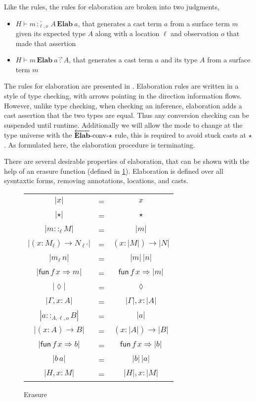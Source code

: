 Like the \bidir{} rules, the rules for elaboration are broken into two judgments,
\begin{itemize}
\item $H\vdash m\overleftarrow{\,:_{\ell,o}\,}A\,\textbf{Elab}\ a$, that generates a cast term $a$ from a surface term $m$ given its expected type $A$ along with a location $\ell$ and observation $o$ that made that assertion
\item $H\vdash m\,\textbf{Elab}\ a\overrightarrow{\,:\,}A$, that generates a cast term $a$ and its type $A$ from a surface term $m$
\end{itemize}
The rules for elaboration are presented in .
Elaboration rules are written in a style of \bidir{} type checking, with arrows pointing in the direction information flows.
However, unlike \bidir{} type checking, when checking an inference, elaboration adds a cast assertion that the two types are equal.
Thus any conversion checking can be suspended until runtime.
Additionally we will allow the mode to change at the type universe with the $\operatorname{\overleftarrow{\textbf{Elab}}-conv-\star}$ rule, this is required to avoid stuck casts at $\star$.
As formulated here, the elaboration procedure is terminating.
 
There are several desirable properties of elaboration, that can be shown with the help of an erasure function (defined in \ref{fig:erasure}).
Elaboration is defined over all sysntaxtic forms, removing annotations, locations, and casts.
 
\begin{figure}
\begin{tabular}{ccc}
$|x|$ & = & $x$\tabularnewline
$|\star|$ & = & $\star$\tabularnewline
$|m::_{\ell}M|$ & = & $|m|$\tabularnewline
$|\left(x:M_{\ell}\right)\rightarrow N_{\ell'}|$ & = & $\left(x:|M|\right)\rightarrow|N|$\tabularnewline
$|m_{\ell}\,n|$ & = & $|m|\,|n|$\tabularnewline
$|\mathsf{fun}\,f\,x\Rightarrow m|$ & = & $\mathsf{fun}\,f\,x\Rightarrow|m|$\tabularnewline
$|\lozenge|$ & = & $\lozenge$\tabularnewline
$|\Gamma,x:A|$ & = & $|\Gamma|,x:|A|$\tabularnewline
$|a::_{A,\ell,o}B|$ & = & $|a|$\tabularnewline
$|\left(x:A\right)\rightarrow B|$ & = & $\left(x:|A|\right)\rightarrow|B|$\tabularnewline
$|\mathsf{fun}\,f\,x\Rightarrow b|$ & = & $\mathsf{fun}\,f\,x\Rightarrow|b|$\tabularnewline
$|b\,a|$ & = & $|b|\,|a|$\tabularnewline
$|H,x:M|$ & = & $|H|,x:|M|$\tabularnewline
\end{tabular}
\caption{Erasure}
\label{fig:erasure}
\end{figure}
 
